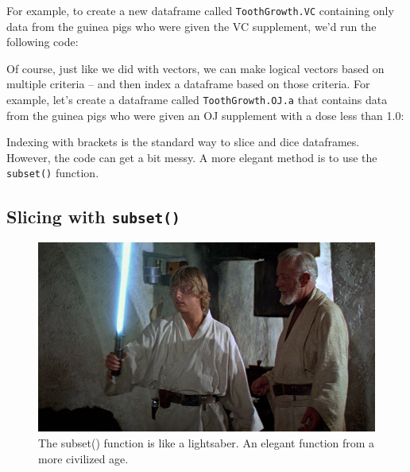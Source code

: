 \documentclass[]{book}
\newenvironment{Shaded}{\begin{snugshade}}{\end{snugshade}}
\newcommand{\DecValTok}[1]{\textcolor[rgb]{0.00,0.00,0.81}{{#1}}}
\newcommand{\StringTok}[1]{\textcolor[rgb]{0.31,0.60,0.02}{{#1}}}
\newcommand{\CommentTok}[1]{\textcolor[rgb]{0.56,0.35,0.01}{\textit{{#1}}}}
\newcommand{\NormalTok}[1]{{#1}}
\theoremstyle{definition}
\theoremstyle{definition}
\theoremstyle{remark}
\begin{document}
For example, to create a new dataframe called \texttt{ToothGrowth.VC}
containing only data from the guinea pigs who were given the VC
supplement, we'd run the following code:

\begin{Shaded}
\end{Shaded}

Of course, just like we did with vectors, we can make logical vectors
based on multiple criteria -- and then index a dataframe based on those
criteria. For example, let's create a dataframe called
\texttt{ToothGrowth.OJ.a} that contains data from the guinea pigs who
were given an OJ supplement with a dose less than 1.0:

\begin{Shaded}
\end{Shaded}

Indexing with brackets is the standard way to slice and dice dataframes.
However, the code can get a bit messy. A more elegant method is to use
the \texttt{subset()} function.

\subsection{\texorpdfstring{Slicing with
\texttt{subset()}}{Slicing with subset()}}\label{slicing-with-subset}

\begin{figure}

{\centering \includegraphics[width=0.5\linewidth]{images/saber} 

}

\caption{The subset() function is like a lightsaber. An elegant function from a more civilized age.}\label{fig:unnamed-chunk-217}
\end{figure}
\end{document}
